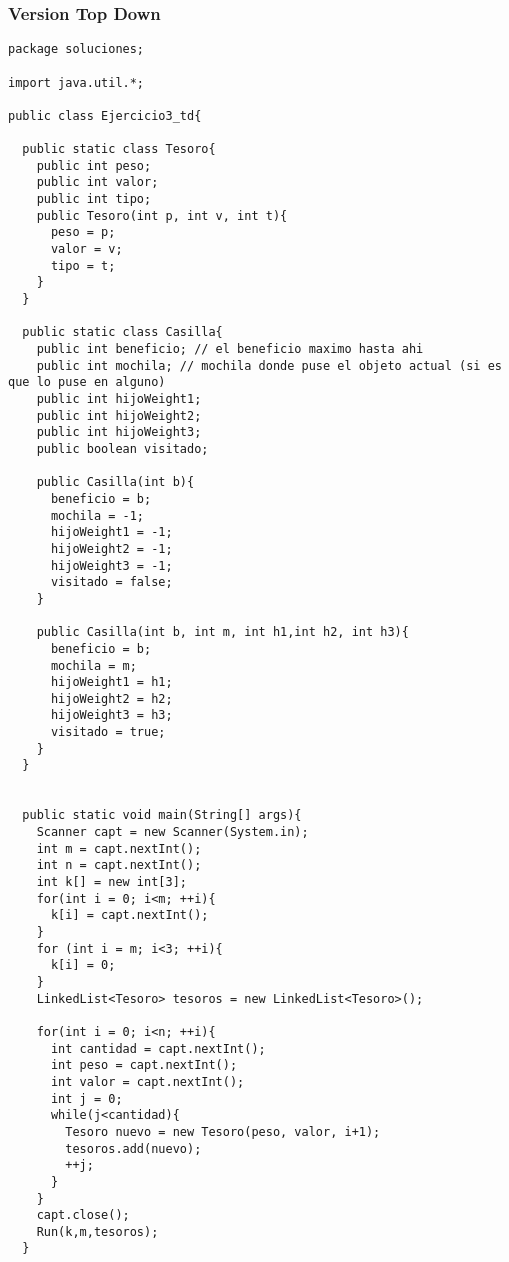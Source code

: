 \subsubsection{Version Top Down}
	\begin{lstlisting}
package soluciones;

import java.util.*;

public class Ejercicio3_td{

  public static class Tesoro{
    public int peso;
    public int valor;
    public int tipo;
    public Tesoro(int p, int v, int t){
      peso = p;
      valor = v;
      tipo = t;
    }
  }

  public static class Casilla{
    public int beneficio; // el beneficio maximo hasta ahi
    public int mochila; // mochila donde puse el objeto actual (si es que lo puse en alguno)
    public int hijoWeight1;
    public int hijoWeight2;
    public int hijoWeight3;
    public boolean visitado;

    public Casilla(int b){
      beneficio = b;
      mochila = -1;
      hijoWeight1 = -1;
      hijoWeight2 = -1;
      hijoWeight3 = -1;
      visitado = false;
    }

    public Casilla(int b, int m, int h1,int h2, int h3){
      beneficio = b;
      mochila = m;
      hijoWeight1 = h1;
      hijoWeight2 = h2;
      hijoWeight3 = h3;
      visitado = true;
    }
  }


  public static void main(String[] args){
    Scanner capt = new Scanner(System.in);
    int m = capt.nextInt();
    int n = capt.nextInt();
    int k[] = new int[3];
    for(int i = 0; i<m; ++i){
      k[i] = capt.nextInt();
    }
    for (int i = m; i<3; ++i){
      k[i] = 0;
    }
    LinkedList<Tesoro> tesoros = new LinkedList<Tesoro>();

    for(int i = 0; i<n; ++i){
      int cantidad = capt.nextInt();
      int peso = capt.nextInt();
      int valor = capt.nextInt();
      int j = 0;
      while(j<cantidad){
        Tesoro nuevo = new Tesoro(peso, valor, i+1);
        tesoros.add(nuevo);
        ++j;
      }
    }
    capt.close();
    Run(k,m,tesoros);
  }


\end{lstlisting}
